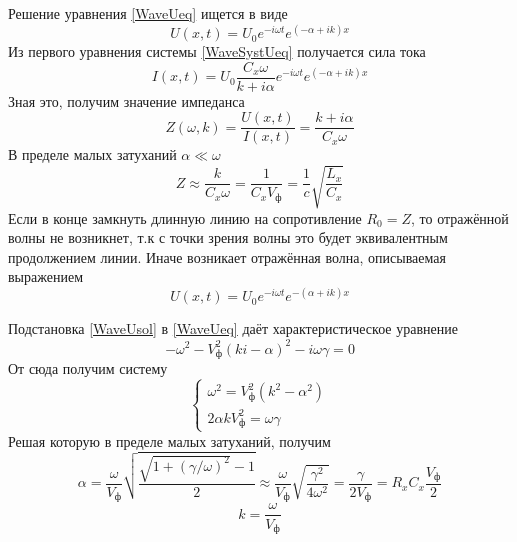 \documentclass[a4paper,12pt]{article}
\theoremstyle{definition}
\begin{document}
 	Решение уравнения \eqref{WaveUeq} ищется в виде
 	\begin{equation}\label{WaveUsol}
 		U(x,t)=U_0e^{-i\omega t}e^{(-\alpha+ik)x}
 	\end{equation}
 	Из первого уравнения системы \eqref{WaveSystUeq} получается сила тока
 	\begin{equation}
 		I(x,t)=U_0\frac{C_x\omega}{k+i\alpha}e^{-i\omega t}e^{(-\alpha+ik)x}
 	\end{equation}
 	Зная это, получим значение импеданса
 	\begin{equation}
 		Z(\omega,k)=\frac{U(x,t)}{I(x,t)}=\frac{k+i\alpha}{C_x\omega}
 	\end{equation}
 	В пределе малых затуханий $\alpha\ll\omega$
 	\begin{equation}
 		Z\approx\frac{k}{C_x\omega}=\frac{1}{C_xV_\text{ф}}=\frac{1}{c}\sqrt{\frac{L_x}{C_x}}
 	\end{equation}
 	Если в конце замкнуть длинную линию на сопротивление $R_0=Z$, то отражённой волны не возникнет, т.к с точки зрения волны это будет эквивалентным продолжением линии. Иначе возникает отражённая волна, описываемая выражением
 	\begin{equation}
 		U(x,t)=U_0e^{-i\omega t}e^{-(\alpha+ik)x}
 	\end{equation}
 
 	Подстановка \eqref{WaveUsol} в \eqref{WaveUeq} даёт характеристическое уравнение
 	\begin{equation}
 		-\omega^2-V_\text{ф}^2(ki-\alpha)^2-i\omega\gamma=0
 	\end{equation}
 	От сюда получим систему
 	\begin{equation}
 		\begin{cases}
 			\omega^2=V_\text{ф}^2(k^2-\alpha^2)
 			\\
 			2\alpha kV_\text{ф}^2=\omega\gamma
 		\end{cases}
 	\end{equation}
 	Решая которую в пределе малых затуханий, получим
 	\begin{equation}\label{alphaSol}
 		\alpha=\frac{\omega}{V_\text{ф}}\sqrt{\frac{\sqrt{1+(\gamma/\omega)^2}-1}{2}}\approx\frac{\omega}{V_\text{ф}}\sqrt{\frac{\gamma^2}{4\omega^2}}=\frac{\gamma}{2V_\text{ф}}=R_xC_x\frac{V_\text{ф}}{2}
 	\end{equation}
 	\begin{equation}\label{kSol}
 		k=\frac{\omega}{V_\text{ф}}
 	\end{equation}
 	
\end{document}
